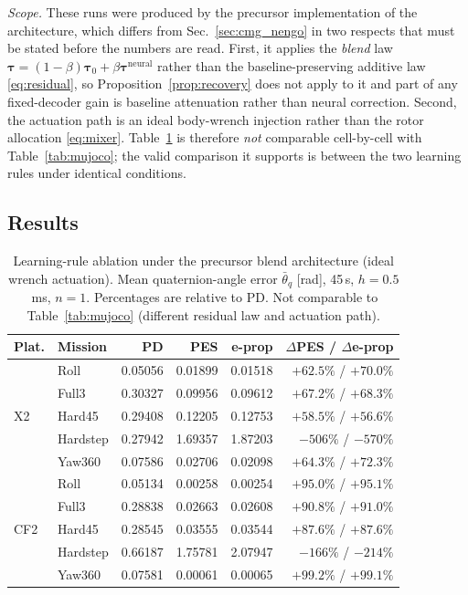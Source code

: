 \documentclass[letterpaper,10pt,conference]{IEEEtran}
\begin{document}
\emph{Scope.} These runs were produced by the precursor implementation of
the architecture, which differs from Sec.~\ref{sec:cmg_nengo} in two
respects that must be stated before the numbers are read. First, it applies
the \emph{blend} law $\bm\tau=(1-\beta)\bm\tau_0+\beta\bm\tau^{\mathrm{neural}}$
rather than the baseline-preserving additive law \eqref{eq:residual}, so
Proposition~\ref{prop:recovery} does not apply to it and part of any
fixed-decoder gain is baseline attenuation rather than neural correction.
Second, the actuation path is an ideal body-wrench injection rather than the
rotor allocation \eqref{eq:mixer}. Table~\ref{tab:eprop} is therefore
\emph{not} comparable cell-by-cell with Table~\ref{tab:mujoco}; the valid
comparison it supports is between the two learning rules under identical
conditions.

\subsection{Results}

\begin{table}[!t]
\caption{Learning-rule ablation under the precursor blend architecture
(ideal wrench actuation). Mean quaternion-angle error $\bar\theta_q$ [rad],
45\,s, $h=0.5$\,ms, $n=1$. Percentages are relative to PD. Not comparable
to Table~\ref{tab:mujoco} (different residual law and actuation path).}
\label{tab:eprop}
\centering
\small
\begin{tabular}{llrrrr}
\toprule
Plat. & Mission & PD & PES & e-prop & $\Delta$PES / $\Delta$e-prop \\
\midrule
\multirow{5}{*}{X2}
 & Roll     & 0.05056 & 0.01899 & 0.01518 & $+62.5\%$ / $\bm{+70.0\%}$ \\
 & Full3    & 0.30327 & 0.09956 & 0.09612 & $+67.2\%$ / $\bm{+68.3\%}$ \\
 & Hard45   & 0.29408 & 0.12205 & 0.12753 & $\bm{+58.5\%}$ / $+56.6\%$ \\
 & Hardstep & 0.27942 & 1.69357 & 1.87203 & $-506\%$ / $-570\%$ \\
 & Yaw360   & 0.07586 & 0.02706 & 0.02098 & $+64.3\%$ / $\bm{+72.3\%}$ \\
\midrule
\multirow{5}{*}{CF2}
 & Roll     & 0.05134 & 0.00258 & 0.00254 & $+95.0\%$ / $\bm{+95.1\%}$ \\
 & Full3    & 0.28838 & 0.02663 & 0.02608 & $+90.8\%$ / $\bm{+91.0\%}$ \\
 & Hard45   & 0.28545 & 0.03555 & 0.03544 & $+87.6\%$ / $\bm{+87.6\%}$ \\
 & Hardstep & 0.66187 & 1.75781 & 2.07947 & $-166\%$ / $-214\%$ \\
 & Yaw360   & 0.07581 & 0.00061 & 0.00065 & $\bm{+99.2\%}$ / $+99.1\%$ \\
\bottomrule
\end{tabular}
\end{table}
\end{document}
